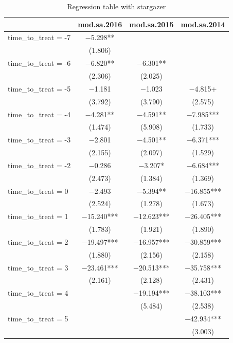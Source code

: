 \documentclass[
]{article}
\begin{document}
\begin{table}

\caption{\label{tab:table-4}Regression table with stargazer}
\centering
\begin{tabular}[t]{lccc}
\toprule
  & mod.sa.2016 & mod.sa.2015 & mod.sa.2014\\
\midrule
time\_to\_treat = -7 & \num{-5.298}** &  & \\
 & (\num{1.806}) &  & \\
time\_to\_treat = -6 & \num{-6.820}** & \num{-6.301}** & \\
 & (\num{2.306}) & (\num{2.025}) & \\
time\_to\_treat = -5 & \num{-1.181} & \num{-1.023} & \num{-4.815}+\\
 & (\num{3.792}) & (\num{3.790}) & (\num{2.575})\\
time\_to\_treat = -4 & \num{-4.281}** & \num{-4.591}** & \num{-7.985}***\\
 & (\num{1.474}) & (\num{5.908}) & (\num{1.733})\\
time\_to\_treat = -3 & \num{-2.801} & \num{-4.501}** & \num{-6.371}***\\
 & (\num{2.155}) & (\num{2.097}) & (\num{1.529})\\
time\_to\_treat = -2 & \num{-0.286} & \num{-3.207}* & \num{-6.684}***\\
 & (\num{2.473}) & (\num{1.384}) & (\num{1.369})\\
time\_to\_treat = 0 & \num{-2.493} & \num{-5.394}** & \num{-16.855}***\\
 & (\num{2.524}) & (\num{1.278}) & (\num{1.673})\\
time\_to\_treat = 1 & \num{-15.240}*** & \num{-12.623}*** & \num{-26.405}***\\
 & (\num{1.783}) & (\num{1.921}) & (\num{1.890})\\
time\_to\_treat = 2 & \num{-19.497}*** & \num{-16.957}*** & \num{-30.859}***\\
 & (\num{1.880}) & (\num{2.156}) & (\num{2.158})\\
time\_to\_treat = 3 & \num{-23.461}*** & \num{-20.513}*** & \num{-35.758}***\\
 & (\num{2.161}) & (\num{2.128}) & (\num{2.431})\\
time\_to\_treat = 4 &  & \num{-19.194}*** & \num{-38.103}***\\
 &  & (\num{5.484}) & (\num{2.538})\\
time\_to\_treat = 5 &  &  & \num{-42.934}***\\
 &  &  & (\num{3.003})\\

\end{tabular}
\end{table}
\end{document}
